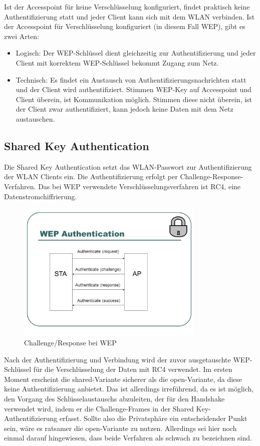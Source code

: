 	Ist der Accesspoint für keine Verschlüsselung konfiguriert, findet praktisch keine Authentifizierung statt und jeder Client kann sich mit dem WLAN verbinden.
	Ist der Accesspoint für Verschlüsselung konfiguriert (in diesem Fall WEP), gibt es zwei Arten: \\
	\begin{itemize}
	\item Logisch: Der WEP-Schlüssel dient gleichzeitig zur Authentifizierung und jeder Client mit korrektem WEP-Schlüssel bekommt Zugang zum Netz.

	\item Technisch: Es findet ein Austausch von Authentifizierungsnachrichten statt und der Client wird authentifiziert. Stimmen WEP-Key auf Accesspoint und Client überein, ist Kommunikation möglich. Stimmen diese nicht überein, ist der Client zwar authentifiziert, kann jedoch keine Daten mit dem Netz austauschen. \\
	\end{itemize}

	\subsection{Shared Key Authentication}
	Die Shared Key Authentication setzt das WLAN-Passwort zur Authentifizierung der WLAN Clients ein. Die Authentifizierung erfolgt per Challenge-Response-Verfahren. Das bei WEP verwendete Verschlüsselungsverfahren ist RC4, eine Datenstromchiffrierung. \\
		\begin{figure}[H]
			\centering
			\includegraphics[width=0.8\textwidth]{images/WLAN/WEPchres.jpg}
			\caption{Challenge/Response bei WEP}
			\label{fig:Challenge/Response bei WEP}
		\end{figure}
	Nach der Authentifizierung und Verbindung wird der zuvor ausgetauschte WEP-Schlüssel für die Verschlüsselung der Daten mit RC4 verwendet. Im ersten Moment erscheint die shared-Variante sicherer als die open-Variante, da diese keine Authentifizierung anbietet. Das ist allerdings irreführend, da es ist möglich, den Vorgang des Schlüsselaustauschs abzuleiten, der für den Handshake verwendet wird, indem er die Challenge-Frames in der Shared Key-Authentifizierung erfasst. Sollte also die Privatsphäre ein entscheidender Punkt sein, wäre es ratsamer die open-Variante zu nutzen. Allerdings sei hier noch einmal darauf hingewiesen, dass beide Verfahren als schwach zu bezeichnen sind.

